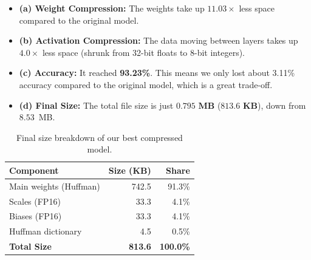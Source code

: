 \documentclass[11pt,a4paper]{article}
\begin{document}
\begin{itemize}

\item \textbf{(a) Weight Compression:} The weights take up $\mathbf{11.03\times}$ less space compared to the original model.

\item \textbf{(b) Activation Compression:} The data moving between layers takes up $\mathbf{4.0\times}$ less space (shrunk from 32-bit floats to 8-bit integers).

\item \textbf{(c) Accuracy:} It reached \textbf{93.23\%}. This means we only lost about 3.11\% accuracy compared to the original model, which is a great trade-off.

\item \textbf{(d) Final Size:} The total file size is just $\mathbf{0.795\text{ MB}}$ ($\mathbf{813.6\text{ KB}}$), down from $8.53$~MB.

\end{itemize}

\begin{table}[ht]
\centering
\begin{tabular}{@{}lrr@{}}
\toprule
\textbf{Component} & \textbf{Size (KB)} & \textbf{Share} \\
\midrule
Main weights (Huffman) & 742.5 & 91.3\% \\
Scales (FP16) & 33.3 & 4.1\% \\
Biases (FP16) & 33.3 & 4.1\% \\
Huffman dictionary & 4.5 & 0.5\% \\
\midrule
\textbf{Total Size} & \textbf{813.6} & \textbf{100.0\%} \\
\bottomrule
\end{tabular}
\caption{Final size breakdown of our best compressed model.}
\label{tab:overhead-final}
\end{table}
\end{document}
